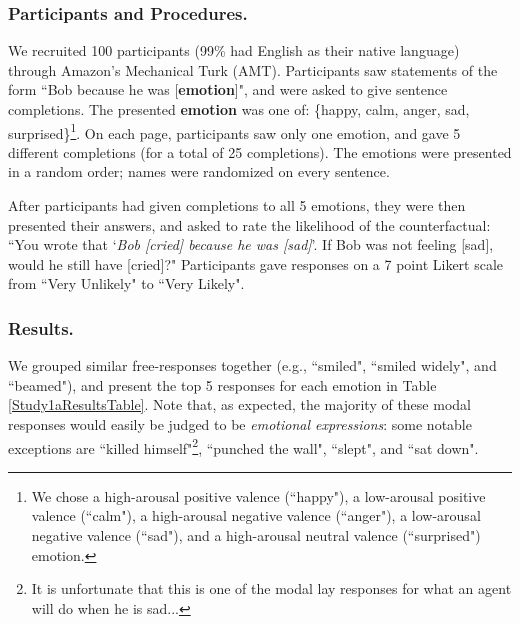 \documentclass[10pt,letterpaper]{article}
\begin{document}
\subsubsection{Participants and Procedures.} 
We recruited 100 participants (99\% had English as their native language) through Amazon's Mechanical Turk (AMT). Participants saw statements of the form ``Bob \underline{\hspace{3em}} because he was [\textbf{emotion}]", and were asked to give sentence completions. The presented \textbf{emotion} was one of: \{happy, calm, anger, sad, surprised\}\footnote{We chose a high-arousal positive valence (``happy"), a low-arousal positive valence (``calm"), a high-arousal negative valence (``anger"), a low-arousal negative valence (``sad"), and a high-arousal neutral valence (``surprised") emotion.}. On each page, participants saw only one emotion, and gave 5 different completions (for a total of 25 completions). The emotions were presented in a random order; names were randomized on every sentence.

After participants had given completions to all 5 emotions, they were then presented their answers, and asked to rate the likelihood of the counterfactual: ``You wrote that `\textit{Bob [cried] because he was [sad]}'. If Bob was not feeling [sad], would he still have [cried]?" Participants gave responses on a 7 point Likert scale from ``Very Unlikely" to ``Very Likely". 




\subsubsection{Results.} 
We grouped similar free-responses together (e.g., ``smiled", ``smiled widely", and ``beamed"), and present the top 5 responses for each emotion in Table \ref{Study1aResultsTable}. Note that, as expected, the majority of these modal responses would easily be judged to be \textit{emotional expressions}: some notable exceptions are ``killed himself"\footnote{It is unfortunate that this is one of the modal lay responses for what an agent will do when he is sad...}, ``punched the wall", ``slept", and ``sat down".
\end{document}

